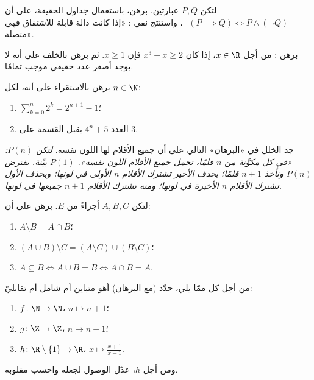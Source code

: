\begin{exercise}[$\star$]\label{exo:b1:logic:2}
لتكن $P, Q$ عبارتين. برهن، باستعمال جداول الحقيقة، على أن
$\lnot(P \implies Q) \iff P \land (\lnot Q)$، واستنتج نفي :
«إذا كانت دالة قابلة للاشتقاق فهي متصلة».
\end{exercise}

\begin{exercise}[$\star$]\label{exo:b1:logic:3}
برهن : من أجل $x \in \R$، إذا كان $x^3 + x \geq 2$ فإن
$x \geq 1$. ثم برهن بالخلف على أنه لا يوجد أصغر عدد حقيقي موجب
تمامًا.
\end{exercise}

\begin{exercise}[$\star$]\label{exo:b1:logic:4}
برهن بالاستقراء على أنه، لكل $n \in \N$:
\begin{enumerate}
  \item $\sum_{k=0}^{n} 2^k = 2^{n+1} - 1$؛
  \item العدد $4^n + 5$ يقبل القسمة على $3$.
\end{enumerate}
\end{exercise}

\begin{exercise}[$\star$]\label{exo:b1:logic:5}
جد الخلل في «البرهان» التالي على أن جميع الأقلام لها اللون نفسه.
\emph{لتكن $P(n)$: «في كل  مكوَّنة من $n$ قلمًا، تحمل جميع
الأقلام اللون نفسه».  $P(1)$ بيّنة. نفترض $P(n)$ ونأخذ
$n+1$ قلمًا؛ بحذف الأخير تشترك الأقلام $n$ الأولى في لونها؛ وبحذف
الأول تشترك الأقلام $n$ الأخيرة في لونها؛ ومنه تشترك الأقلام
$n+1$ جميعها في لونها.}
\end{exercise}

\begin{exercise}[$\star$]\label{exo:b1:logic:6}
لتكن $A, B, C$ أجزاءً من $E$. برهن على أن:
\begin{enumerate}
  \item $A \setminus B = A \cap \overline{B}$؛
  \item $(A \cup B) \setminus C = (A \setminus C) \cup (B \setminus
        C)$؛
  \item $A \subseteq B \iff A \cup B = B \iff A \cap B = A$.
\end{enumerate}
\end{exercise}

\begin{exercise}[$\star\star$]\label{exo:b1:logic:7}
من أجل كل  ممّا يلي، حدّد (مع البرهان) أهو متباين أم شامل أم
تقابليّ:
\begin{enumerate}
  \item $f \colon \N \to \N$، $n \mapsto n + 1$؛
  \item $g \colon \Z \to \Z$، $n \mapsto n + 1$؛
  \item $h \colon \R \setminus \{1\} \to \R$، $x \mapsto
        \frac{x+1}{x-1}$.
\end{enumerate}
ومن أجل $h$، عدّل  الوصول لجعله  واحسب مقلوبه.
\end{exercise}

